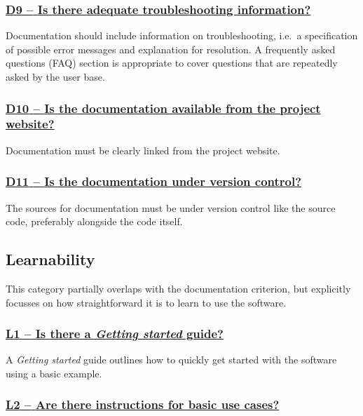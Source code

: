 \documentclass[a4paper,11pt]{article}
\newcommand{\indicator}[1]{\subsubsection*{\underline{#1}}}
\begin{document}
\newcommand{\dNineName}{D9}
\newcommand{\dNineID}{\dNineName}
\newcommand{\dNineText}{Is there adequate troubleshooting information?}
\indicator{\dNineName{ }--{ }\dNineText}\label{id:d9}

Documentation should include information on troubleshooting, i.e.\ a
specification of possible error messages and explanation for resolution. A
frequently asked questions (FAQ) section is appropriate to cover questions
that are repeatedly asked by the user base.

\newcommand{\dTenName}{D10}
\newcommand{\dTenID}{\dTenName}
\newcommand{\dTenText}{Is the documentation available from the project website?}
\indicator{\dTenName{ }--{ }\dTenText}\label{id:d10}

Documentation must be clearly linked from the project website.

\newcommand{\dElevenName}{D11}
\newcommand{\dElevenID}{\dElevenName}
\newcommand{\dElevenText}{Is the documentation under version control?}
\indicator{\dElevenName{ }--{ }\dElevenText}\label{id:d11}

The sources for documentation must be under version control like the source
code, preferably alongside the code itself.

\subsection{Learnability}\label{sec:lea}

This category partially overlaps with the documentation criterion, but explicitly
focusses on how straightforward it is to learn to use the software.

\newcommand{\lOneName}{L1}
\newcommand{\lOneID}{\lOneName}
\newcommand{\lOneText}{Is there a \textit{Getting started} guide?}
\indicator{\lOneName{ }--{ }\lOneText}\label{id:l1} %

A \textit{Getting started} guide outlines how to quickly get started with the software using a basic example.

\newcommand{\lTwoName}{L2}
\newcommand{\lTwoID}{\lTwoName}
\newcommand{\lTwoText}{Are there instructions for basic use cases?}
\indicator{\lTwoName{ }--{ }\lTwoText}\label{id:l2} 
\end{document}
